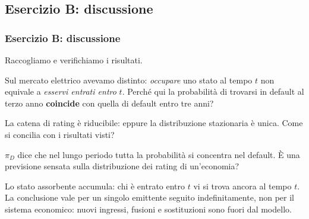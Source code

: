 

\subsection{Esercizio B: discussione}%

\begin{frame}%
%

\frametitle{Esercizio B: discussione}%
%

%


Raccogliamo e verifichiamo i risultati.

\medskip

\begin{stepitemize}


\item Sul mercato elettrico avevamo distinto: \emph{occupare} uno stato al
tempo $t$ non equivale a \emph{esservi entrati entro} $t$. Perch\'{e} qui la
probabilit\`{a} di trovarsi in default al terzo anno \textbf{coincide} con
quella di default entro tre anni?

\item La catena di rating \`{e} riducibile: eppure la distribuzione
stazionaria \`{e} unica. Come si concilia con i risultati visti?

\item $\pi_{D}$ dice che nel lungo periodo tutta la probabilit\`{a} si
concentra nel default. \`{E} una previsione sensata sulla distribuzione dei
rating di un'economia?
\end{stepitemize}

\medskip

\begin{center}
{\small Lo stato assorbente accumula: chi \`{e} entrato entro $t$ vi si trova
ancora al tempo $t$. La conclusione vale per un singolo emittente seguito
indefinitamente, non per il sistema economico: nuovi ingressi, fusioni e
sostituzioni sono fuori dal modello.}
\end{center}

%

\transboxout
\end{frame}%


